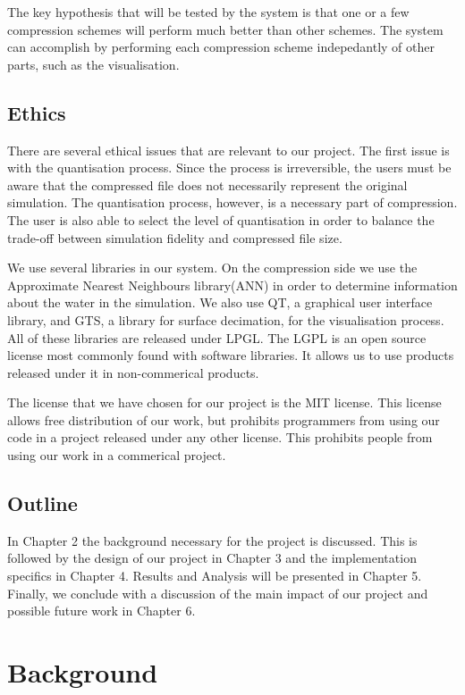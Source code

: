 \documentclass[a4paper,11pt]{report}
\begin{document}
The key hypothesis that will be tested by the system is that one or a few compression schemes will perform much better than other schemes. The system can accomplish by performing each compression scheme indepedantly of other parts, such as the visualisation.

\section{Ethics}

There are several ethical issues that are relevant to our project. The first issue is with the quantisation process. Since the process is irreversible, the users must be aware that the compressed file does not necessarily represent the original simulation. The quantisation process, however, is a necessary part of compression. The user is also able to select the level of quantisation in order to balance the trade-off between simulation fidelity and compressed file size. 

We use several libraries in our system. On the compression side we use the Approximate Nearest Neighbours library(ANN) in order to determine information about the water in the simulation. We also use QT, a graphical user interface library, and GTS, a library for surface decimation, for the visualisation process. All of these libraries are released under LPGL. The LGPL is an open source license most commonly found with software libraries. It allows us to use products released under it in non-commerical products. 

The license that we have chosen for our project is the MIT license. This license allows free distribution of our work, but prohibits programmers from using our code in a project released under any other license. This prohibits people from using our work in a commerical project.

\section{Outline}

In Chapter 2 the background necessary for the project is discussed. This is followed by the design of our project in Chapter 3 and the implementation specifics in Chapter 4. Results and Analysis will be presented in Chapter 5. Finally, we conclude with a discussion of the main impact of our project and possible future work in Chapter 6.


\chapter{Background}
\end{document}

